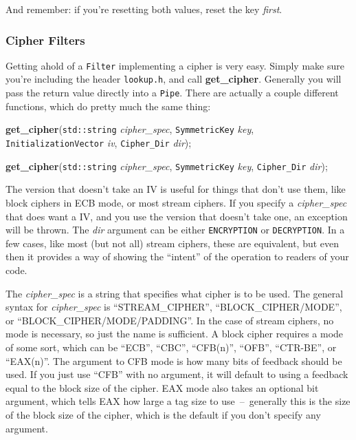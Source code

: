 \documentclass{article}
\newcommand{\filename}[1]{\texttt{#1}}
\newcommand{\function}[1]{\textbf{#1}}
\newcommand{\type}[1]{\texttt{#1}}
\renewcommand{\arg}[1]{\textsl{#1}}
\begin{document}
And remember: if you're resetting both values, reset the key \emph{first}.

\pagebreak

\subsubsection{Cipher Filters}

Getting ahold of a \type{Filter} implementing a cipher is very easy. Simply
make sure you're including the header \filename{lookup.h}, and call
\function{get\_cipher}. Generally you will pass the return value directly into
a \type{Pipe}. There are actually a couple different functions, which do pretty
much the same thing:

\function{get\_cipher}(\type{std::string} \arg{cipher\_spec},
                       \type{SymmetricKey} \arg{key},
                       \type{InitializationVector} \arg{iv},
                       \type{Cipher\_Dir} \arg{dir});

\function{get\_cipher}(\type{std::string} \arg{cipher\_spec},
                       \type{SymmetricKey} \arg{key},
                       \type{Cipher\_Dir} \arg{dir});

The version that doesn't take an IV is useful for things that don't use them,
like block ciphers in ECB mode, or most stream ciphers. If you specify a
\arg{cipher\_spec} that does want a IV, and you use the version that doesn't
take one, an exception will be thrown. The \arg{dir} argument can be either
\type{ENCRYPTION} or \type{DECRYPTION}. In a few cases, like most (but not all)
stream ciphers, these are equivalent, but even then it provides a way of
showing the ``intent'' of the operation to readers of your code.

The \arg{cipher\_spec} is a string that specifies what cipher is to be
used. The general syntax for \arg{cipher\_spec} is ``STREAM\_CIPHER'',
``BLOCK\_CIPHER/MODE'', or ``BLOCK\_CIPHER/MODE/PADDING''. In the case of
stream ciphers, no mode is necessary, so just the name is sufficient. A block
cipher requires a mode of some sort, which can be ``ECB'', ``CBC'', ``CFB(n)'',
``OFB'', ``CTR-BE'', or ``EAX(n)''. The argument to CFB mode is how many bits
of feedback should be used. If you just use ``CFB'' with no argument, it will
default to using a feedback equal to the block size of the cipher. EAX mode
also takes an optional bit argument, which tells EAX how large a tag size to
use~--~generally this is the size of the block size of the cipher, which is the
default if you don't specify any argument.
\end{document}

